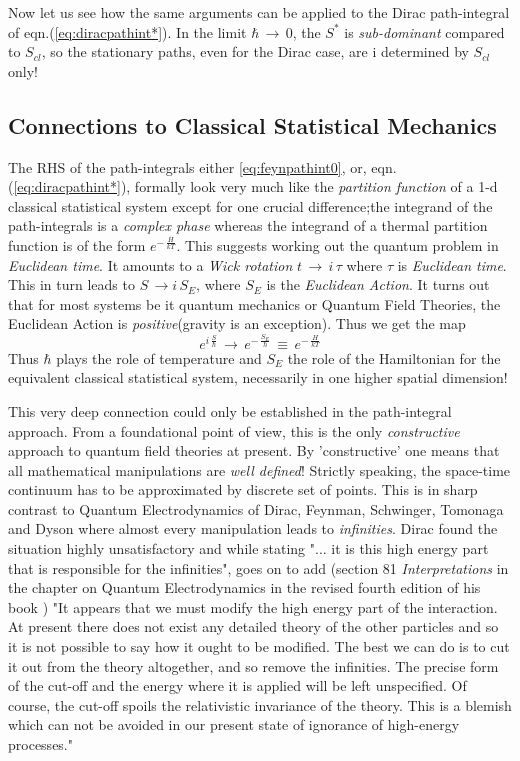 \documentclass[a4paper]{JHEP3}
\newcommand{\be}{\begin{equation}}
\newcommand{\ee}{\end{equation}}
\begin{document}
Now let us see how the same arguments can be applied to the Dirac path-integral of eqn.(\ref{eq:diracpathint*}). In the limit 
$\hbar\,\rightarrow\, 0$, the $S^*$ is \emph{sub-dominant} compared to $S_{cl}$, so the stationary paths, even for the Dirac case, are i
determined by $S_{cl}$ only!
\subsection{Connections to Classical Statistical Mechanics}
The RHS of the path-integrals either \ref{eq:feynpathint0}, or, eqn.(\ref{eq:diracpathint*}), formally look very much like 
the {\it partition function} of a 1-d classical
statistical system except for one crucial difference;the integrand of the path-integrals is a {\it complex phase} whereas the integrand of
a thermal partition function is of the form $e^{-\,\frac{H}{kT}}$. This suggests working out the quantum problem in {\it Euclidean time}. It
amounts to a {\it Wick rotation} $t\,\rightarrow\,i\,\tau$ where $\tau$ is {\it Euclidean time}. This in turn leads to $S\,\rightarrow i\,S_E$,
where $S_E$ is the {\it Euclidean Action}.
It turns out that for most systems be it 
quantum mechanics or Quantum Field Theories, the  Euclidean Action is {\it positive}(gravity is an exception). Thus we get the map
\be
\label{eq:euclidean}
e^{i\,\frac{S}{\hbar}}\,\rightarrow\,e^{-\,\frac{S_E}{\hbar}}\,\equiv\,e^{-\,\frac{H}{kT}}
\ee
Thus $\hbar$ plays the role of temperature and $S_E$ the role of the Hamiltonian for the equivalent classical statistical system, necessarily
in one higher spatial dimension!

This very deep connection could only be established in the path-integral approach. From a foundational point of view, this is the only
{\it constructive} approach to quantum field theories at present. By 'constructive' one means that all mathematical manipulations are
{\it well defined}! Strictly speaking, the space-time continuum has to be approximated by discrete set of points. This is in sharp contrast 
to Quantum Electrodynamics of Dirac, Feynman, Schwinger, Tomonaga and Dyson where almost 
every manipulation leads to {\it infinities}. Dirac found the situation highly unsatisfactory and while stating "... it is this high 
energy part that is
responsible for the infinities", goes on to add (section 81 {\it Interpretations} in the chapter on Quantum Electrodynamics in the revised
fourth edition of his book \cite{diracbook4r}) "It appears that we must modify the high energy part of the interaction. At present there 
does not 
exist any detailed theory of the other particles and so it is not possible to say how it ought to be modified. The best we can do is to cut it
out from the theory altogether, and so remove the infinities. The precise form of the cut-off and the energy where it is applied 
will be left unspecified. Of course, the cut-off spoils the relativistic invariance of the theory. This is a blemish which can not be avoided
in our present state of ignorance of high-energy processes."
\end{document}
